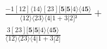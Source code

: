 \documentclass[varwidth, border=5pt]{standalone}
\begin{document}
\begin{my}
$\begin{gathered}
\scriptscriptstyle\frac{-1[12]⟨14⟩[23][𝟓|𝟓|4⟩⟨4𝟓⟩}{⟨12⟩⟨23⟩⟨4|1+3|2]²} +\\
\scriptscriptstyle\frac{3[23][𝟓|𝟓|4⟩⟨4𝟓⟩}{⟨12⟩⟨23⟩⟨4|1+3|2]} \phantom{+}
\end{gathered}$
\end{my}
\end{document}
